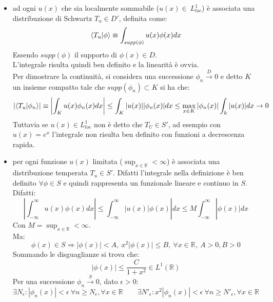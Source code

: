 \documentclass[twoside]{article}
\begin{document}
\begin{itemize}
    \item ad ogni $u(x)$ che sia localmente sommabile ($u(x)\in \ L^1_{loc}$) è associata una distribuzione di Schwartz $T_u\in D'$, definita come:
    \begin{equation}
        \bra{T_u}\ket{\phi}\equiv\int_{supp(\phi)} u(x)\phi(x)dx
    \end{equation}
    Essendo $supp(\phi)$ il supporto di $\phi(x)\in D$.\\
    L'integrale risulta quindi ben definito e la linearità è ovvia.\\
    Per dimostrare la continuità, si considera una successione $\phi_n\xrightarrow{D}0$ e detto $K$ un insieme compatto tale che $supp(\phi_n)\subset K$ si ha che:
    \begin{equation}
        \left|\bra{T_u}\ket{\phi_n}\right|\equiv\left|\int_{K} u(x)\phi_n(x)dx\right|\le \int_{K} |u(x)||\phi_n(x)|dx\le \max_{x\in K}|\phi_n(x)|\int_k|u(x)|dx\to 0
    \end{equation}
    Tuttavia se $u(x)\in L^1_{loc}$ non è detto che $T_U\in S'$, ad esempio con $u(x)=e^x$ l'integrale non risulta ben definito con funzioni a decrescenza rapida.
    \item per ogni funzione $u(x)$ limitata ($\sup_{x\in\mathds{R}}<\infty$) è associata una distribuzione temperata $T_u\in S'$. Difatti l'integrale nella definizione è ben definito $\forall \phi\in S$ e quindi rappresenta un funzionale lineare e continuo in $S$. Difatti:
    \begin{equation}
        \left|\int_{-\infty}^\infty u(x)\phi(x)dx\right|\le \int_{-\infty}^\infty|u(x)|\phi(x)|dx\le M\int_{-\infty}^\infty|\phi(x)|dx
    \end{equation}
    Con $M=\sup_{x\in\mathds{R}}<\infty$.\\
    Ma:
    \begin{equation}
        \phi(x)\in S\Longrightarrow |\phi(x)|<A, \ x^2|\phi(x)|\le B, \ \forall x\in \mathds{R},\ A>0,B>0
    \end{equation}
    Sommando le disguaglianze si trova che:
    \begin{equation}
        |\phi(x)|\le \frac{C}{1+x^2}\in L^1(\mathds{R})
    \end{equation}
    Per una successione $\phi_n\xrightarrow{S}0$, dato $\epsilon>0$:
    \begin{equation}
        \exists N_\epsilon : |\phi_n(x)|<\epsilon\ \forall n\ge N_\epsilon, \forall x\in\mathds{R} \qquad \exists N'_\epsilon : x^2|\phi_n(x)|<\epsilon\ \forall n\ge N'_\epsilon, \forall x\in\mathds{R}

\end{equation}
\end{itemize}
\end{document}
